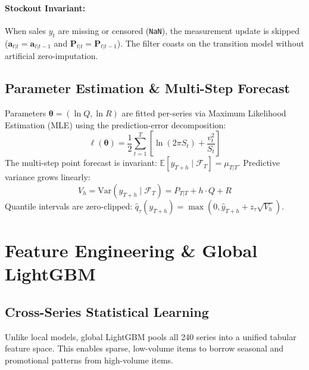 \documentclass[11pt,a4paper]{article}
\begin{document}
\paragraph{Stockout Invariant:} When sales $y_t$ are missing or censored (\texttt{NaN}), the measurement update is skipped ($\mathbf{a}_{t|t} = \mathbf{a}_{t|t-1}$ and $\mathbf{P}_{t|t} = \mathbf{P}_{t|t-1}$). The filter coasts on the transition model without artificial zero-imputation.

\subsection{Parameter Estimation \& Multi-Step Forecast}
Parameters $\boldsymbol{\theta} = (\ln Q, \ln R)$ are fitted per-series via Maximum Likelihood Estimation (MLE) using the prediction-error decomposition:
\begin{equation}
\ell(\boldsymbol{\theta}) = \frac{1}{2}\sum_{t=1}^T \left[ \ln(2\pi S_t) + \frac{v_t^2}{S_t} \right]
\end{equation}
The multi-step point forecast is invariant: $\mathbb{E}[y_{T+h} \mid \mathcal{F}_T] = \mu_{T|T}$. Predictive variance grows linearly:
\begin{equation}
V_h = \text{Var}(y_{T+h} \mid \mathcal{F}_T) = P_{T|T} + h \cdot Q + R
\end{equation}
Quantile intervals are zero-clipped: $\hat{q}_\tau(y_{T+h}) = \max(0, \hat{y}_{T+h} + z_\tau \sqrt{V_h})$.

\section{Feature Engineering \& Global LightGBM}

\subsection{Cross-Series Statistical Learning}
Unlike local models, global LightGBM pools all 240 series into a unified tabular feature space. This enables sparse, low-volume items to borrow seasonal and promotional patterns from high-volume items.
\end{document}

